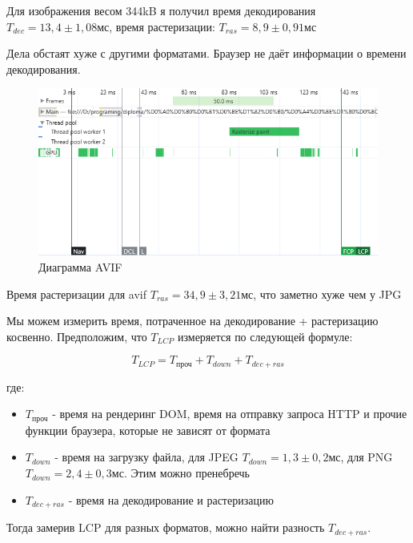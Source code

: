 \documentclass[12pt]{article}
\begin{document}
Для изображения весом 344kB я получил время декодирования
$T_{dec}=13,4 \pm 1,08 \text{мс}$, время растеризации: $T_{ras}=8,9 \pm 0,91 \text{мс}$

Дела обстаят хуже с другими форматами. Браузер не даёт информации о
времени декодирования.

\begin{figure}[H]
    \centering
    \includegraphics[width=1\textwidth]{../images/image_comp/avif_one_image.png}
    \caption{Диаграмма AVIF}
\end{figure}

Время растеризации для avif $T_{ras}=34,9 \pm 3,21\text{мс}$, что заметно хуже чем у JPG

Мы можем измерить время, потраченное на декодирование + растеризацию косвенно.
Предположим, что $T_{LCP}$ измеряется по следующей формуле:

\[
    T_{LCP} = T_{\text{проч}} + T_{down} + T_{dec+ras}
\]

где:

\begin{itemize}
    \item $T_{\text{проч}}$ - время на рендеринг DOM, время на отправку
          запроса HTTP и прочие
          функции браузера, которые не зависят от формата
    \item $T_{down}$ - время на загрузку файла, для JPEG $T_{down} = 1,3 \pm 0,2 \text{мс}$, для PNG $T_{down} = 2,4 \pm 0,3 \text{мс}$. Этим можно пренебречь
    \item $T_{dec+ras}$ - время на декодирование и растеризацию
\end{itemize}

Тогда замерив LCP для разных форматов, можно найти разность $T_{dec+ras}$.
\end{document}

